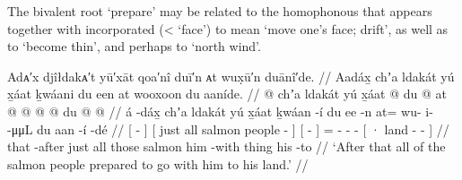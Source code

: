 The bivalent root  ‘prepare’ may be related to the homophonous  that appears together with incorporated  (<  ‘face’) to mean ‘move one’s face; drift’, as well as to  ‘become thin’, and perhaps to  ‘north wind’.

\ex\label{ex:100-83-prepared-to-go}%
%
\begingl
	\glpreamble	Adᴀ′x djîłdakᴀ′t yū′xāt qoa′nî duī′n ᴀt wux̣ū′n duānî′de. //
	\glpreamble	Aadáx̱ chʼa ldakát yú x̱áat ḵwáani du een at wooxoon du aaníde. //
	\gla	{}  @ {} {} 
		{} chʼa ldakát yú x̱áat  @ {} {}
		{} du  @ {} {}
		at @  @ {} @ {} @ {}
		{} du  @ {} @ {} {} //
	\glb	{} á -dáx̱ {}
		{} chʼa ldakát yú x̱áat ḵwáan -í {}
		{} du ee -n {}
		at= wu- i-  -μμL
		{} du aan -í -dé {} //
	\glc	{}[  - {}]
		{}[ just all  salmon people - {}]
		{}[   - {}]
		= - -  -
		{}[ · land - - {}] //
	\gld	{} that -after {} 
		{} just all those salmon  {} {} 
		{} him {} -with {}
		thing  {} {} {}
		{} his  {} -to {} //
	\glft	‘After that all of the salmon people prepared to go with him to his land.’
		//
\endgl
\xe

